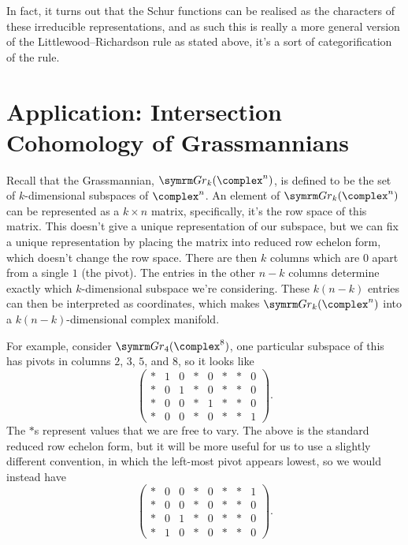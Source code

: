 In fact, it turns out that the Schur functions can be realised as the characters of these irreducible representations, and as such this is really a more general version of the Littlewood--Richardson rule as stated above, it's a sort of categorification of the rule.

\section{Application: Intersection Cohomology of Grassmannians}
Recall that the Grassmannian, \(\Gr_k(\complex^n)\), is defined to be the set of \(k\)-dimensional subspaces of \(\complex^n\).
An element of \(\Gr_k(\complex^n)\) can be represented as a \(k \times n\) matrix, specifically, it's the row space of this matrix.
This doesn't give a unique representation of our subspace, but we can fix a unique representation by placing the matrix into reduced row echelon form, which doesn't change the row space.
There are then \(k\) columns which are \(0\) apart from a single \(1\) (the pivot).
The entries in the other \(n - k\) columns determine exactly which \(k\)-dimensional subspace we're considering.
These \(k(n-k)\) entries can then be interpreted as coordinates, which makes \(\Gr_k(\complex^n)\) into a \(k(n - k)\)-dimensional complex manifold.

For example, consider \(\Gr_4(\complex^8)\), one particular subspace of this has pivots in columns \(2\), \(3\), \(5\), and \(8\), so it looks like
\begin{equation}
    \begin{pmatrix}
        * & 1 & 0 & * & 0 & * & * & 0\\
        * & 0 & 1 & * & 0 & * & * & 0\\
        * & 0 & 0 & * & 1 & * & * & 0\\
        * & 0 & 0 & * & 0 & * & * & 1
    \end{pmatrix}
    .
\end{equation}
The \(*\)s represent values that we are free to vary.
The above is the standard reduced row echelon form, but it will be more useful for us to use a slightly different convention, in which the left-most pivot appears lowest, so we would instead have
\begin{equation}
    \begin{pmatrix}
        * & 0 & 0 & * & 0 & * & * & 1\\
        * & 0 & 0 & * & 0 & * & * & 0\\
        * & 0 & 1 & * & 0 & * & * & 0\\
        * & 1 & 0 & * & 0 & * & * & 0
    \end{pmatrix}
    .
\end{equation}

